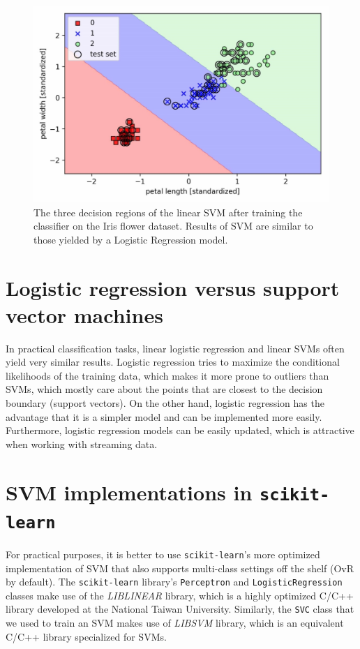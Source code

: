 \documentclass[11pt]{article}
\begin{document}
    \begin{figure}[hbt!]
        \centering
        \includegraphics[width=1\linewidth,trim=4 4 4 4,clip]{img/iris_svm_linear.png}
        \caption{The three decision regions of the linear SVM after training the classifier on the Iris flower dataset.
        Results of SVM are similar to those yielded by a Logistic Regression model.}
        \label{fig:iris_svm_linear}
    \end{figure}

    \section{Logistic regression versus support vector machines} \label{sec:log_reg_vs_svm}

    In practical classification tasks, linear logistic regression and linear SVMs often yield very similar results.
    Logistic regression tries to maximize the conditional likelihoods of the training data, which makes it more prone to outliers than SVMs, which mostly care about the points that are closest to the decision boundary (support vectors).
    On the other hand, logistic regression has the advantage that it is a simpler model and can be implemented more easily.
    Furthermore, logistic regression models can be easily updated, which is attractive when working with streaming data.

    \section{SVM implementations in \texttt{scikit-learn}}\label{sec:svm_sklearn}

    For practical purposes, it is better to use \texttt{scikit-learn}'s more optimized implementation of SVM that also supports multi-class settings off the shelf (OvR by default).
    The \texttt{scikit-learn} library's \texttt{Perceptron} and \texttt{LogisticRegression} classes make use of the \textit{LIBLINEAR} library, which is a highly optimized C/C++ library developed at the National Taiwan University\cite{Fan2008}.
    Similarly, the \texttt{SVC} class that we used to train an SVM makes use of \textit{LIBSVM} library, which is an equivalent C/C++ library specialized for SVMs\cite{Chang2001}.
\end{document}
